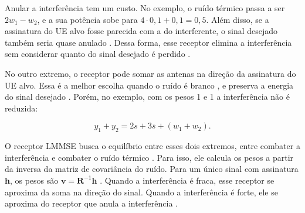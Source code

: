 
Anular a interferência tem um custo. No exemplo, o ruído térmico passa a ser $2w_1 - w_2$, e a sua potência sobe para $4\cdot 0{,}1 + 0{,}1 = 0{,}5$. Além disso, se a assinatura do UE alvo fosse parecida com a do interferente, o sinal desejado também seria quase anulado \cite[p.~81]{tse-viswanath}. Dessa forma, esse receptor elimina a interferência sem considerar quanto do sinal desejado é perdido \cite[p.~358]{tse-viswanath}.

No outro extremo, o receptor pode somar as antenas na direção da assinatura do UE alvo. Essa é a melhor escolha quando o ruído é branco \cite[p.~359]{tse-viswanath}, e preserva a energia do sinal desejado \cite[p.~358]{tse-viswanath}. Porém, no exemplo, com os pesos 1 e 1 a interferência não é reduzida:

$$
y_1 + y_2 = 2s + 3\overline{s} + (w_1 + w_2).
$$



O receptor LMMSE busca o equilíbrio entre esses dois extremos, entre combater a interferência e combater o ruído térmico \cite[p.~358]{tse-viswanath}. Para isso, ele calcula os pesos a partir da inversa da matriz de covariância do ruído. Para um único sinal com assinatura $\mathbf{h}$, os pesos são $\mathbf{v}=\mathbf{R}^{-1}\mathbf{h}$ \cite[p.~359]{tse-viswanath}. Quando a interferência é fraca, esse receptor se aproxima da soma na direção do sinal. Quando a interferência é forte, ele se aproxima do receptor que anula a interferência \cite[p.~360]{tse-viswanath}.

